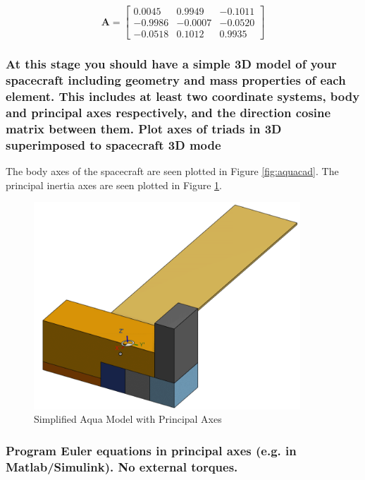 \begin{equation*}
    \boldsymbol{A} = \begin{bmatrix}
            0.0045  &  0.9949 &  -0.1011 \\
            -0.9986  & -0.0007  & -0.0520 \\
            -0.0518  &  0.1012  &  0.9935
    \end{bmatrix}
\end{equation*}

\subsubsection{At this stage you should have a simple 3D model of your spacecraft including geometry and mass properties of each element. This includes at least two coordinate systems, body and principal axes respectively, and the direction cosine matrix between them. Plot axes of triads in 3D superimposed to spacecraft 3D mode}

The body axes of the spacecraft are seen plotted in Figure \ref{fig:aquacad}. The principal inertia axes are seen plotted in Figure \ref{fig:aquacad_principal}.

\begin{figure}[H]
    \centering
    \includegraphics[width = 10cm]{Images/AquaSat_PrincipalAxes.png}
    \caption{Simplified Aqua Model with Principal Axes}
    \label{fig:aquacad_principal}
\end{figure}

\subsubsection{Program Euler equations in principal axes (e.g. in Matlab/Simulink). No external torques.}

